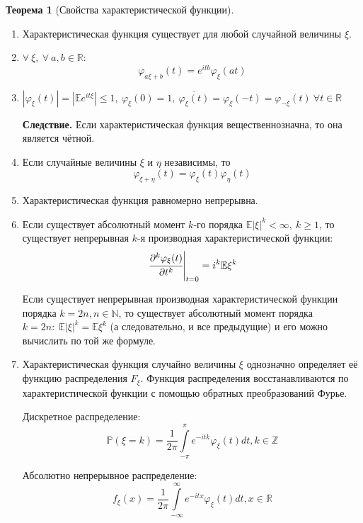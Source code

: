 \documentclass[oneside,final,14pt]{extreport}
\newcommand\mycon{{\bf Следствие.}}
\theoremstyle{plain}
\theoremstyle{definition}
\theoremstyle{named}
\newtheorem*{namedthm}{Теорема}
\begin{document}
\begin{namedthm}[Свойства характеристической функции]\leavevmode
    \begin{enumerate}
        \item Характеристическая функция существует для любой случайной величины $\xi$.
        \item $\forall~ \xi,~ \forall~ a, b \in \mathbb{R}$:
        \begin{equation*}
            \varphi_{a \xi + b}(t) = e^{itb} \varphi_{\xi}(at)
        \end{equation*}
        \item $|\varphi_{\xi}(t)|=|\mathbb{E} e^{i t \xi}| \leqslant 1,~ \varphi_{\xi}(0) = 1, ~\overline{\varphi_{\xi}(t)} = \varphi_{\xi}(-t) = \varphi_{-\xi}(t) ~\forall t \in \mathbb{R}$
        
        \mycon{}
        Если характеристическая функция вещественнозначна, то она является чётной.
        
        \item Если случайные величины $\xi$ и $\eta$ независимы, то
        \begin{equation*}
            \varphi_{\xi + \eta}(t) = \varphi_{\xi}(t) \varphi_{\eta}(t)
        \end{equation*}
        \item Характеристическая функция равномерно непрерывна.
        \item Если существует абсолютный момент $k$-го порядка $\mathbb{E}|\xi|^{k} < \infty,~ k \geqslant 1$, то существует непрерывная $k$-я производная характеристической функции:
        \begin{equation*}
            \left.\cfrac{\partial^{k} \varphi_{\xi}(t)}{\partial t^{k}}\right|_{t=0}= i^{k} \mathbb{E} \xi^{k}
        \end{equation*}
        
        Если существует непрерывная производная характеристической функции порядка $k = 2n, n \in \mathbb{N}$, то существует абсолютный момент порядка $k = 2n: \; \mathbb{E}|\xi|^k = \mathbb{E}\xi^k$ (а следовательно, и все предыдущие) и его можно вычислить по той же формуле.
        
        \item Характеристическая функция случайно величины $\xi$ однозначно определяет её функцию распределения $F_{\xi}$. Функция распределения восстанавливаются по характеристической функции с помощью обратных преобразований Фурье.
        
        Дискретное распределение:
        \begin{equation*}
            \mathbb{P}(\xi=k)=\frac{1}{2 \pi} \int\limits_{-\pi}^{\pi} e^{-i t k} \varphi_{\xi}(t) d t, k \in \mathbb{Z}
        \end{equation*}
        
        Абсолютно непрерывное распределение:
        \begin{equation*}
            f_{\xi}(x)=\frac{1}{2 \pi} \int\limits_{-\infty}^{\infty} e^{-i t x} \varphi_{\xi}(t) d t, x \in \mathbb{R}
        \end{equation*}
    \end{enumerate}
\end{namedthm}
\end{document}

